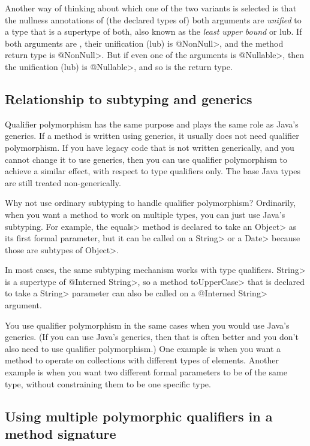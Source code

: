 Another way of thinking about which one of the two  variants is
selected is that the nullness annotations of (the declared types of) both
arguments are \emph{unified} to a type that is a supertype of both, also
known as the \emph{least upper bound} or lub.  If both
arguments are , their unification (lub) is \<@NonNull>, and the
method return type is \<@NonNull>.  But if even one of the arguments is \<@Nullable>,
then the unification (lub) is \<@Nullable>, and so is the return type.



\subsection{Relationship to subtyping and generics\label{qualifier-polymorhism-vs-subtyping}}

Qualifier polymorphism has the same purpose and plays the same role as
Java's generics.  If a method is written using generics, it usually does
not need qualifier polymorphism.  If you have legacy code that is not
written generically, and you cannot change it to use generics, then you can
use qualifier polymorphism to achieve a similar effect, with respect to
type qualifiers only.  The base Java types are still treated non-generically.

Why not use ordinary subtyping to handle qualifier polymorphism?
Ordinarily, when you want a method to work on multiple types, you can just
use Java's subtyping.  For example, the \<equals> method is declared to
take an \<Object> as its first formal parameter, but it can be called on a
\<String> or a \<Date> because those are subtypes of \<Object>.

In most cases, the same subtyping mechanism works with type qualifiers.
\<String> is a supertype of \<@Interned String>, so a method \<toUpperCase>
that is declared to take a \<String> parameter can also be called on a
\<@Interned String> argument.

You use qualifier polymorphism in the same cases when you would use Java's
generics.  (If you can use Java's generics, then that is often better and
you don't also need to use qualifier polymorphism.)  One example is when
you want a method to operate on collections with different types of
elements.  Another example is when you want two different formal parameters
to be of the same type, without constraining them to be one specific type.


\subsection{Using multiple polymorphic qualifiers in a method signature\label{qualifier-polymorphism-multiple-qualifiers}}

